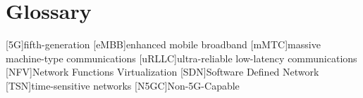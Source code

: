 \chapter{Glossary}

\footnotesize
\SingleSpacing

\begin{multicols}{2}
\begin{acronym}[AAAAAA]

	[5G]{fifth-generation}
	[eMBB]{enhanced mobile broadband}
	[mMTC]{massive machine-type communications}
	[uRLLC]{ultra-reliable low-latency communications}
	[NFV]{Network Functions Virtualization}
	[SDN]{Software Defined Network}
	[TSN]{time-sensitive networks}
	[N5GC]{Non-5G-Capable}

\end{acronym}
\end{multicols}

